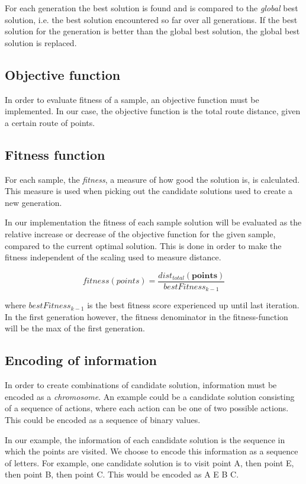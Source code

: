 For each generation the best solution is found and is compared to the \textit{global} best solution, i.e. the best solution encountered so far over all generations. If the best solution for the generation is better than the global best solution, the global best solution is replaced.

\subsection{Objective function}
In order to evaluate fitness of a sample, an objective function must be implemented. In our case, the objective function is the total route distance, given a certain route of points.

\subsection{Fitness function}
For each sample, the \textit{fitness}, a measure of how good the solution is, is calculated. This measure is used when picking out the candidate solutions used to create a new generation.

In our implementation the fitness of each sample solution will be evaluated as the relative increase or decrease of the objective function for the given sample, compared to the current optimal solution. This is done in order to make the fitness independent of the scaling used to measure distance.

\begin{equation}
	fitness(points) = \frac{dist_{total}(\textbf{points})}{bestFitness_{k-1}}
\end{equation}

where $bestFitness_{k-1}$ is the best fitness score experienced up until last iteration. In the first generation however, the fitness denominator in the fitness-function will be the max of the first generation.

\subsection{Encoding of information}
In order to create combinations of candidate solution, information must be encoded as a \textit{chromosome}. An example could be a candidate solution consisting of a sequence of actions, where each action can be one of two possible actions. This could be encoded as a sequence of binary values.

In our example, the information of each candidate solution is the sequence in which the points are visited. We choose to encode this information as a sequence of letters. For example, one candidate solution is to visit point A, then point E, then point B, then point C. This would be encoded as
A E B C.

